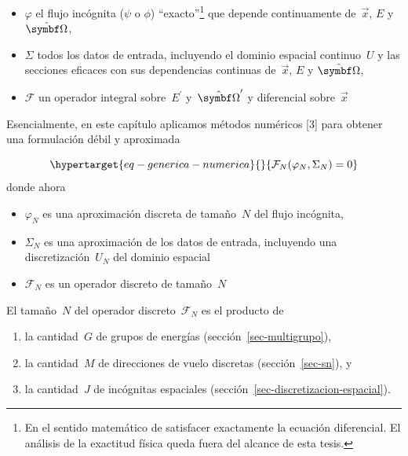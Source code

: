 \documentclass[
  12pt,
  a4paper,
  table]{scrbook}
\providecommand{\tightlist}{%
  \setlength{\itemsep}{0pt}\setlength{\parskip}{0pt}}\usepackage{longtable,booktabs,array}
\theoremstyle{plain}
\theoremstyle{definition}
\theoremstyle{plain}
\theoremstyle{plain}
\theoremstyle{remark}
\begin{document}
\begin{itemize}
\tightlist
\item
  \(\varphi\) el flujo incógnita (\(\psi\) o \(\phi\))
  ``exacto''\footnote{En el sentido matemático de satisfacer exactamente
    la ecuación diferencial. El análisis de la exactitud física queda
    fuera del alcance de esta tesis.} que depende continuamente
  de~\(\vec{x}\), \(E\) y \(\omegaversor\),
\item
  \(\Sigma\) todos los datos de entrada, incluyendo el dominio espacial
  continuo~\(U\) y las secciones eficaces con sus dependencias continuas
  de~\(\vec{x}\), \(E\) y \(\omegaversor\),
\item
  \(\mathcal{F}\) un operador integral sobre~\(E^\prime\)
  y~\(\omegaprimaversor\) y diferencial sobre~\(\vec{x}\)
\end{itemize}

Esencialmente, en este capítulo aplicamos métodos numéricos {[}3{]} para
obtener una formulación débil y aproximada

\begin{equation}\protect\hypertarget{eq-generica-numerica}{}{
\mathcal{F}_N(\varphi_N, \Sigma_N) = 0
}\label{eq-generica-numerica}\end{equation} donde ahora

\begin{itemize}
\tightlist
\item
  \(\varphi_N\) es una aproximación discreta de tamaño~\(N\) del flujo
  incógnita,
\item
  \(\Sigma_N\) es una aproximación de los datos de entrada, incluyendo
  una discretización~\(U_N\) del dominio espacial
\item
  \(\mathcal{F}_N\) es un operador discreto de tamaño~\(N\)
\end{itemize}

El tamaño~\(N\) del operador discreto~\(\mathcal{F}_N\) es el producto
de

\begin{enumerate}
\def\labelenumi{\alph{enumi}.}
\tightlist
\item
  la cantidad~\(G\) de grupos de energías
  (sección~\ref{sec-multigrupo}),
\item
  la cantidad~\(M\) de direcciones de vuelo discretas
  (sección~\ref{sec-sn}), y
\item
  la cantidad~\(J\) de incógnitas espaciales
  (sección~\ref{sec-discretizacion-espacial}).
\end{enumerate}
\end{document}
